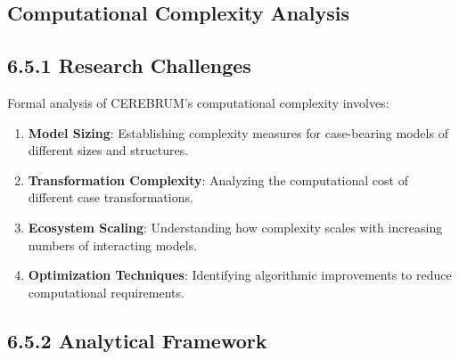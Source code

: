 \documentclass[
  11pt,
  letterpaper,
]{article}
\providecommand{\tightlist}{%
  \setlength{\itemsep}{0pt}\setlength{\parskip}{0pt}}
\begin{document}
\hypertarget{computational-complexity-analysis}{%
\subsection{Computational Complexity
Analysis}\label{computational-complexity-analysis}}

\hypertarget{research-challenges}{%
\subsection{6.5.1 Research Challenges}\label{research-challenges}}

Formal analysis of CEREBRUM's computational complexity involves:

\begin{enumerate}
\def\labelenumi{\arabic{enumi}.}
\tightlist
\item
  \textbf{Model Sizing}: Establishing complexity measures for
  case-bearing models of different sizes and structures.
\item
  \textbf{Transformation Complexity}: Analyzing the computational cost
  of different case transformations.
\item
  \textbf{Ecosystem Scaling}: Understanding how complexity scales with
  increasing numbers of interacting models.
\item
  \textbf{Optimization Techniques}: Identifying algorithmic improvements
  to reduce computational requirements.
\end{enumerate}

\hypertarget{analytical-framework}{%
\subsection{6.5.2 Analytical Framework}\label{analytical-framework}}
\end{document}
